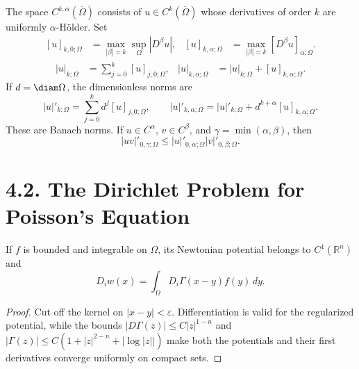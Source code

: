 \begin{definition}\label{gt:def-holder-spaces}
The space $C^{k,\alpha}(\overline\Omega)$ consists of
$u\in C^k(\overline\Omega)$ whose derivatives of order $k$ are uniformly
$\alpha$-H\"older. Set
\begin{equation}
\tag{4.5}
\begin{aligned}
[u]_{k,0;\Omega}&=\max_{|\beta|=k}\sup_\Omega|D^\beta u|,
& [u]_{k,\alpha;\Omega}&=\max_{|\beta|=k}[D^\beta u]_{\alpha;\Omega}.
\end{aligned}
\end{equation}
\begin{equation}
\tag{4.6}
\begin{aligned}
|u|_{k;\Omega}&=\sum_{j=0}^k[u]_{j,0;\Omega},
& |u|_{k,\alpha;\Omega}&=|u|_{k;\Omega}+[u]_{k,\alpha;\Omega}.
\end{aligned}
\end{equation}
If $d=\diam\Omega$, the dimensionless norms are
\[
|u|'_{k;\Omega}=\sum_{j=0}^k d^j[u]_{j,0;\Omega},
\qquad
|u|'_{k,\alpha;\Omega}=|u|'_{k;\Omega}
+d^{k+\alpha}[u]_{k,\alpha;\Omega}.
\tag{4.6'}
\]
These are Banach norms. If
$u\in C^\alpha$, $v\in C^\beta$, and $\gamma=\min(\alpha,\beta)$, then
\begin{equation}
\tag{4.7}
|uv|'_{0,\gamma;\Omega}
\leq |u|'_{0,\alpha;\Omega}|v|'_{0,\beta;\Omega}.
\end{equation}
\end{definition}

\section*{4.2. The Dirichlet Problem for Poisson's Equation}

\begin{lemma}\label{gt:lem-newtonian-c1}
If $f$ is bounded and integrable on $\Omega$, its Newtonian potential belongs
to $C^1(\mathbb R^n)$ and
\begin{equation}
\tag{4.8}
D_iw(x)=\int_\Omega D_i\Gamma(x-y)f(y)\,dy.
\end{equation}
\end{lemma}
\begin{proof}
\sketch Cut off the kernel on $|x-y|<\varepsilon$. Differentiation is valid
for the regularized potential, while the bounds
$|D\Gamma(z)|\leq C|z|^{1-n}$ and
$|\Gamma(z)|\leq C(1+|z|^{2-n}+|\log|z||)$ make both the potentials and
their first derivatives converge uniformly on compact sets.
\end{proof}

